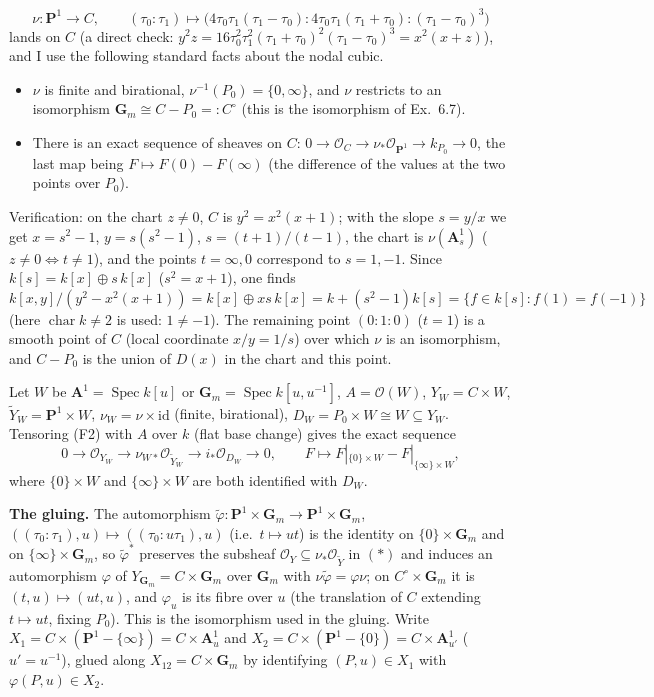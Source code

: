 \documentclass[11pt]{article}
\begin{document}
\[
\nu:\mathbf P^1\to C,\qquad (\tau_0:\tau_1)\mapsto\bigl(4\tau_0\tau_1(\tau_1-\tau_0):4\tau_0\tau_1(\tau_1+\tau_0):(\tau_1-\tau_0)^3\bigr)
\]
lands on $C$ (a direct check: $y^2z=16\tau_0^2\tau_1^2(\tau_1+\tau_0)^2(\tau_1-\tau_0)^3=x^2(x+z)$), and I use the following standard facts about the nodal cubic.
\begin{itemize}
\item[(F1)] $\nu$ is finite and birational, $\nu^{-1}(P_0)=\{0,\infty\}$, and $\nu$ restricts to an isomorphism $\mathbf G_m\cong C-P_0=:C^\circ$ (this is the isomorphism of Ex.~6.7).
\item[(F2)] There is an exact sequence of sheaves on $C$: $0\to\mathcal O_C\to\nu_*\mathcal O_{\mathbf P^1}\to k_{P_0}\to0$, the last map being $F\mapsto F(0)-F(\infty)$ (the difference of the values at the two points over $P_0$).
\end{itemize}
Verification: on the chart $z\ne0$, $C$ is $y^2=x^2(x+1)$; with the slope $s=y/x$ we get $x=s^2-1$, $y=s(s^2-1)$, $s=(t+1)/(t-1)$, the chart is $\nu(\mathbf A^1_s)$ ($z\ne0\iff t\ne1$), and the points $t=\infty,0$ correspond to $s=1,-1$. Since $k[s]=k[x]\oplus s\,k[x]$ ($s^2=x+1$), one finds $k[x,y]/(y^2-x^2(x+1))=k[x]\oplus xs\,k[x]=k+(s^2-1)k[s]=\{f\in k[s]:f(1)=f(-1)\}$ (here $\operatorname{char}k\ne2$ is used: $1\ne-1$). The remaining point $(0:1:0)$ ($t=1$) is a smooth point of $C$ (local coordinate $x/y=1/s$) over which $\nu$ is an isomorphism, and $C-P_0$ is the union of $D(x)$ in the chart and this point.

Let $W$ be $\mathbf A^1=\operatorname{Spec}k[u]$ or $\mathbf G_m=\operatorname{Spec}k[u,u^{-1}]$, $A=\mathcal O(W)$, $Y_W=C\times W$, $\tilde Y_W=\mathbf P^1\times W$, $\nu_W=\nu\times\mathrm{id}$ (finite, birational), $D_W=P_0\times W\cong W\subseteq Y_W$. Tensoring (F2) with $A$ over $k$ (flat base change) gives the exact sequence
\[
0\to\mathcal O_{Y_W}\to\nu_{W*}\mathcal O_{\tilde Y_W}\to i_*\mathcal O_{D_W}\to0,\qquad F\mapsto F|_{\{0\}\times W}-F|_{\{\infty\}\times W}, \tag{$*$}
\]
where $\{0\}\times W$ and $\{\infty\}\times W$ are both identified with $D_W$.

\textbf{The gluing.} The automorphism $\tilde\varphi:\mathbf P^1\times\mathbf G_m\to\mathbf P^1\times\mathbf G_m$, $((\tau_0:\tau_1),u)\mapsto((\tau_0:u\tau_1),u)$ (i.e.\ $t\mapsto ut$) is the identity on $\{0\}\times\mathbf G_m$ and on $\{\infty\}\times\mathbf G_m$, so $\tilde\varphi^*$ preserves the subsheaf $\mathcal O_{Y}\subseteq\nu_*\mathcal O_{\tilde Y}$ in $(*)$ and induces an automorphism $\varphi$ of $Y_{\mathbf G_m}=C\times\mathbf G_m$ over $\mathbf G_m$ with $\nu\tilde\varphi=\varphi\nu$; on $C^\circ\times\mathbf G_m$ it is $(t,u)\mapsto(ut,u)$, and $\varphi_u$ is its fibre over $u$ (the translation of $C$ extending $t\mapsto ut$, fixing $P_0$). This is the isomorphism used in the gluing. Write $X_1=C\times(\mathbf P^1-\{\infty\})=C\times\mathbf A^1_u$ and $X_2=C\times(\mathbf P^1-\{0\})=C\times\mathbf A^1_{u'}$ ($u'=u^{-1}$), glued along $X_{12}=C\times\mathbf G_m$ by identifying $(P,u)\in X_1$ with $\varphi(P,u)\in X_2$.
\end{document}
